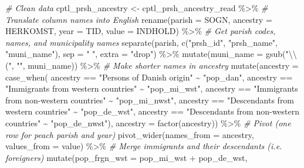 \documentclass[
  12pt,
]{article}
\newenvironment{Shaded}{\begin{snugshade}}{\end{snugshade}}
\newcommand{\AttributeTok}[1]{\textcolor[rgb]{0.77,0.63,0.00}{#1}}
\newcommand{\CommentTok}[1]{\textcolor[rgb]{0.56,0.35,0.01}{\textit{#1}}}
\newcommand{\FunctionTok}[1]{\textcolor[rgb]{0.00,0.00,0.00}{#1}}
\newcommand{\NormalTok}[1]{#1}
\newcommand{\OtherTok}[1]{\textcolor[rgb]{0.56,0.35,0.01}{#1}}
\newcommand{\SpecialCharTok}[1]{\textcolor[rgb]{0.00,0.00,0.00}{#1}}
\newcommand{\StringTok}[1]{\textcolor[rgb]{0.31,0.60,0.02}{#1}}
\begin{document}
\begin{Shaded}
\begin{Highlighting}[]
\CommentTok{\# Clean data }
\NormalTok{cptl\_prsh\_ancestry }\OtherTok{\textless{}{-}}\NormalTok{ cptl\_prsh\_ancestry\_read }\SpecialCharTok{\%\textgreater{}\%} 
  \CommentTok{\# Translate column names into English}
  \FunctionTok{rename}\NormalTok{(}\AttributeTok{parish =}\NormalTok{ SOGN,}
         \AttributeTok{ancestry =}\NormalTok{ HERKOMST,}
         \AttributeTok{year =}\NormalTok{ TID, }
         \AttributeTok{value =}\NormalTok{ INDHOLD) }\SpecialCharTok{\%\textgreater{}\%}
  \CommentTok{\# Get parish codes, names, and municipality names}
  \FunctionTok{separate}\NormalTok{(parish,}
           \FunctionTok{c}\NormalTok{(}\StringTok{"prsh\_id"}\NormalTok{, }\StringTok{"prsh\_name"}\NormalTok{, }\StringTok{"muni\_name"}\NormalTok{),}
           \AttributeTok{sep =} \StringTok{" "}\NormalTok{,}
           \AttributeTok{extra =} \StringTok{"drop"}\NormalTok{) }\SpecialCharTok{\%\textgreater{}\%} 
  \FunctionTok{mutate}\NormalTok{(}\AttributeTok{muni\_name =} \FunctionTok{gsub}\NormalTok{(}\StringTok{"}\SpecialCharTok{\textbackslash{}\textbackslash{}}\StringTok{("}\NormalTok{, }\StringTok{""}\NormalTok{, muni\_name)) }\SpecialCharTok{\%\textgreater{}\%} 
  \CommentTok{\# Make shorter names in ancestry}
  \FunctionTok{mutate}\NormalTok{(}\AttributeTok{ancestry =} \FunctionTok{case\_when}\NormalTok{(}
\NormalTok{    ancestry }\SpecialCharTok{==} \StringTok{"Persons of Danish origin"} \SpecialCharTok{\textasciitilde{}} \StringTok{"pop\_dan"}\NormalTok{,}
\NormalTok{    ancestry }\SpecialCharTok{==} \StringTok{"Immigrants from western countries"} \SpecialCharTok{\textasciitilde{}} \StringTok{"pop\_mi\_wst"}\NormalTok{,}
\NormalTok{    ancestry }\SpecialCharTok{==} \StringTok{"Immigrants from non{-}western countries"} \SpecialCharTok{\textasciitilde{}} \StringTok{"pop\_mi\_nwst"}\NormalTok{,}
\NormalTok{    ancestry }\SpecialCharTok{==} \StringTok{"Descendants from western countries"} \SpecialCharTok{\textasciitilde{}} \StringTok{"pop\_de\_wst"}\NormalTok{,}
\NormalTok{    ancestry }\SpecialCharTok{==} \StringTok{"Descendants from non{-}western countries"} \SpecialCharTok{\textasciitilde{}} \StringTok{"pop\_de\_nwst"}\NormalTok{), }
    \AttributeTok{ancestry =} \FunctionTok{factor}\NormalTok{(ancestry)) }\SpecialCharTok{\%\textgreater{}\%} 
  \CommentTok{\# Pivot (one row for peach parish and year)}
  \FunctionTok{pivot\_wider}\NormalTok{(}\AttributeTok{names\_from =}\NormalTok{ ancestry, }\AttributeTok{values\_from =}\NormalTok{ value) }\SpecialCharTok{\%\textgreater{}\%} 
  \CommentTok{\# Merge immigrants and their descendants (i.e. foreigners) }
  \FunctionTok{mutate}\NormalTok{(}\AttributeTok{pop\_frgn\_wst =}\NormalTok{ pop\_mi\_wst }\SpecialCharTok{+}\NormalTok{ pop\_de\_wst, }

\end{Highlighting}
\end{Shaded}
\end{document}
